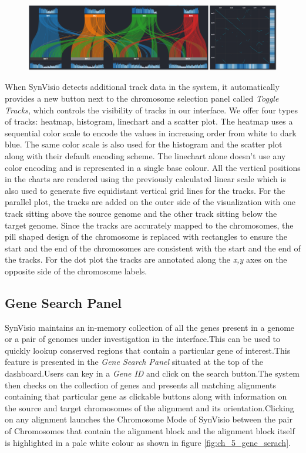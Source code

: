 \begin{figure}
  \centering
  \includegraphics[width=1\linewidth]{images/ch_5_tracks.PNG}
  \label{fig:ch_5_tracks}
\end{figure}
When SynVisio detects additional track data in the system, it automatically provides a new button next to the chromosome selection panel called \textit{Toggle Tracks}, which controls
the visibility of tracks in our interface. We offer four types of tracks: heatmap, histogram, linechart and a scatter plot. The heatmap uses a sequential color scale to encode the values in increasing order from white to dark blue. The same color scale is also used for the histogram and the scatter plot along with their default encoding scheme. The linechart alone doesn't use any color encoding and is represented in a single base colour. All the vertical positions in the charts are rendered using the previously calculated linear scale which is also used to generate five equidistant vertical grid lines for the tracks. For the parallel plot, the tracks are added on the outer side of the visualization with one track sitting above the source genome and the other track sitting below the target genome. Since the tracks are accurately mapped to the chromosomes, the pill shaped design of the chromosome is replaced with rectangles to ensure the start and the end of the chromosomes are consistent with the start and the end of the tracks. For the dot plot the tracks are annotated along the \textit{x,y} axes on the opposite side of the chromosome labels.


\subsection{Gene Search Panel}
SynVisio maintains an in-memory collection of all the genes present in a genome or a pair of genomes under investigation in the interface.This can be used to quickly lookup conserved regions that contain a particular gene of interest.This feature is presented in the \textit{Gene Search Panel} situated at the top of the dashboard.Users can key in a \textit{Gene ID} and click on the search button.The system then checks on the collection of genes and presents all matching alignments containing that particular gene as clickable buttons along with information on the source and target chromosomes of the alignment and its orientation.Clicking on any alignment launches the Chromosome Mode of SynVisio between the pair of Chromosomes that contain the alignment block and the alignment block itself is highlighted in a pale white colour as shown in figure \ref{fig:ch_5_gene_serach}. 

